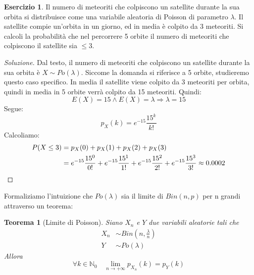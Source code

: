 \documentclass{article}
\theoremstyle{plain}
\newtheorem{teorema}{Teorema}[section]
\theoremstyle{definition}
\newtheorem{esercizio}{Esercizio}[section]
\theoremstyle{remark}
\newenvironment{soluzione}
	{\renewcommand\qedsymbol{$\mathwitch*$}\begin{proof}[Soluzione]}
	{\end{proof}}
\renewcommand{\qedsymbol}{$\mathrightghost$}
\begin{document}
\begin{esercizio}
	Il numero di meteoriti che colpiscono un satellite durante la sua orbita si distribuisce come una variabile aleatoria di Poisson di parametro $\lambda$. Il satellite compie un'orbita in un giorno, ed in media è colpito da 3 meteoriti. Si calcoli la probabilità che nel percorrere 5 orbite il numero di meteoriti che colpiscono il satellite sia $\leq3$.
	\begin{soluzione}
		Dal testo, il numero di meteoriti che colpiscono un satellite durante la sua orbita è $X\sim Po(\lambda)$. Siccome la domanda si riferisce a 5 orbite, studieremo questo caso specifico. In media il satellite viene colpito da 3 meteoriti per orbita, quindi in media in 5 orbite verrà colpito da 15 meteoriti. Quindi:
		\begin{equation*}
			E(X)=15\wedge E(X)=\lambda\Rightarrow \lambda=15
		\end{equation*}
		Segue:
		\begin{equation*}
			p_X(k)=e^{-15}\frac{15^k}{k!}
		\end{equation*}
		Calcoliamo:
		\begin{align*}
			P(X\leq3)&=p_X(0)+p_X(1)+p_X(2)+p_X(3)\\
			&=e^{-15}\frac{15^0}{0!}+e^{-15}\frac{15^1}{1!}+e^{-15}\frac{15^2}{2!}+e^{-15}\frac{15^3}{3!}\approx 0.0002\qedhere
		\end{align*}
	\end{soluzione}
\end{esercizio}
Formaliziamo l'intuizione che $Po(\lambda)$ sia il limite di $Bin(n,p)$ per n grandi attraverso un teorema:
\begin{teorema}[Limite di Poisson]
	Siano $X_n$ e $Y$ due variabili aleatorie tali che
	\begin{align*}
		X_n&\sim Bin\left(n, \frac{\lambda}{n}\right)\\
		Y&\sim Po(\lambda)
	\end{align*}
	Allora
	\begin{equation*}
		\forall k\in\mathds{N}_0\quad \lim_{n\to+\infty}p_{X_n}(k)=p_Y(k)
	\end{equation*}
\end{teorema}
\end{document}
